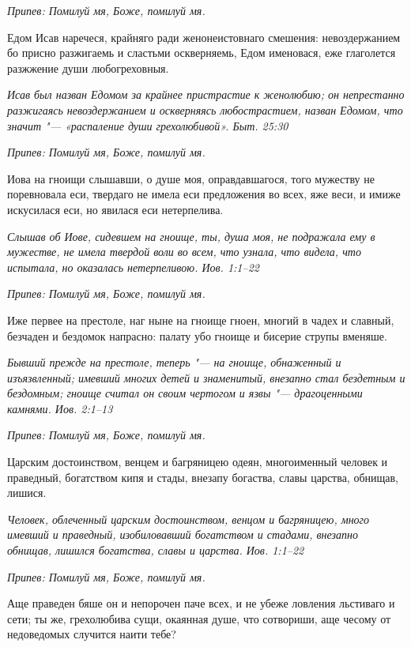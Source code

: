 \itshape Припев:\normalfont{} Помилуй мя, Боже, помилуй мя.


Едом Исав наречеся, крайняго ради женонеистовнаго смешения: невоздержанием бо присно разжигаемь и сластьми оскверняемь, Едом именовася, еже глаголется разжжение души любогреховныя.


\itshape Исав был назван Едомом за крайнее пристрастие к женолюбию; он непрестанно разжигаясь невоздержанием и оскверняясь любострастием, назван Едомом, что значит "--- «распаление души грехолюбивой». Быт. 25:30\normalfont{}


\itshape Припев:\normalfont{} Помилуй мя, Боже, помилуй мя.


Иова на гноищи слышавши, о душе моя, оправдавшагося, того мужеству не поревновала еси, твердаго не имела еси предложения во всех, яже веси, и имиже искусилася еси, но явилася еси нетерпелива.


\itshape Слышав об Иове, сидевшем на гноище, ты, душа моя, не подражала ему в мужестве, не имела твердой воли во всем, что узнала, что видела, что испытала, но оказалась нетерпеливою. Иов. 1:1–22\normalfont{}


\itshape Припев:\normalfont{} Помилуй мя, Боже, помилуй мя.


Иже первее на престоле, наг ныне на гноище гноен, многий в чадех и славный, безчаден и бездомок напрасно: палату убо гноище и бисерие струпы вменяше.


\itshape Бывший прежде на престоле, теперь "--- на гноище, обнаженный и изъязвленный; имевший многих детей и знаменитый, внезапно стал бездетным и бездомным; гноище считал он своим чертогом и язвы "--- драгоценными камнями. Иов. 2:1–13\normalfont{}


\itshape Припев:\normalfont{} Помилуй мя, Боже, помилуй мя.


Царским достоинством, венцем и багряницею одеян, многоименный человек и праведный, богатством кипя и стады, внезапу богаства, славы царства, обнищав, лишися.


\itshape Человек, облеченный царским достоинством, венцом и багряницею, много имевший и праведный, изобиловавший богатством и стадами, внезапно обнищав, лишился богатства, славы и царства. Иов. 1:1–22\normalfont{}


\itshape Припев:\normalfont{} Помилуй мя, Боже, помилуй мя.


Аще праведен бяше он и непорочен паче всех, и не убеже ловления льстиваго и сети; ты же, грехолюбива сущи, окаянная душе, что сотвориши, аще чесому от недоведомых случится наити тебе?


